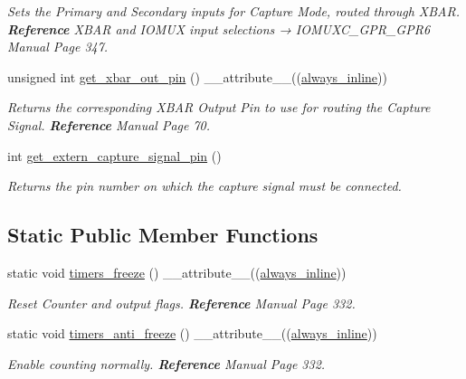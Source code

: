 \begin{DoxyCompactItemize}
\begin{DoxyCompactList}\small\item\em Sets the Primary and Secondary inputs for Capture Mode, routed through X\+B\+AR. {\bfseries Reference} X\+B\+AR and I\+O\+M\+UX input selections → I\+O\+M\+U\+X\+C\+\_\+\+G\+P\+R\+\_\+\+G\+P\+R6 Manual Page 347. \end{DoxyCompactList}\item 
unsigned int \hyperlink{classTMR1Controller_a5b2f74d17a84db6a9c2957b75d79ab98}{get\+\_\+xbar\+\_\+out\+\_\+pin} () \+\_\+\+\_\+attribute\+\_\+\+\_\+((\hyperlink{classTMR1Controller_adce8e8a496510485a88ccc5b88595672}{always\+\_\+inline}))
\begin{DoxyCompactList}\small\item\em Returns the corresponding X\+B\+AR Output Pin to use for routing the Capture Signal. {\bfseries Reference} Manual Page 70. \end{DoxyCompactList}\item 
int \hyperlink{classTMR1Controller_a49a1a48db1600173eeb24858645a0366}{get\+\_\+extern\+\_\+capture\+\_\+signal\+\_\+pin} ()
\begin{DoxyCompactList}\small\item\em Returns the pin number on which the capture signal must be connected. \end{DoxyCompactList}\end{DoxyCompactItemize}
\subsection*{Static Public Member Functions}
\begin{DoxyCompactItemize}
\item 
static void \hyperlink{classTMR1Controller_aa00df5e2d591a36b1049275c9a293c51}{timers\+\_\+freeze} () \+\_\+\+\_\+attribute\+\_\+\+\_\+((\hyperlink{classTMR1Controller_adce8e8a496510485a88ccc5b88595672}{always\+\_\+inline}))
\begin{DoxyCompactList}\small\item\em Reset Counter and output flags. {\bfseries Reference} Manual Page 332. \end{DoxyCompactList}\item 
static void \hyperlink{classTMR1Controller_acb383aa5321f552f018e4e217e2211f4}{timers\+\_\+anti\+\_\+freeze} () \+\_\+\+\_\+attribute\+\_\+\+\_\+((\hyperlink{classTMR1Controller_adce8e8a496510485a88ccc5b88595672}{always\+\_\+inline}))
\begin{DoxyCompactList}\small\item\em Enable counting normally. {\bfseries Reference} Manual Page 332. \end{DoxyCompactList}\end{DoxyCompactItemize}
